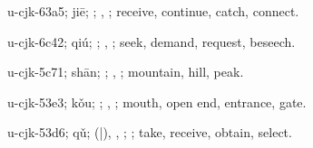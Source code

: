 \begin{multicols}{2}
{\cjkgGlue{}u-cjk-63a5; jiē; \cjkgGlue{}\cjkgGlue{}\cjkgGlue{}; \cjkgGlue{}, \cjkgGlue{}; receive, continue, catch, connect.

\cjkgGlue{}u-cjk-6c42; qiú; \cjkgGlue{}\cjkgGlue{}\cjkgGlue{}; \cjkgGlue{}, \cjkgGlue{}; seek, demand, request, beseech.

\cjkgGlue{}u-cjk-5c71; shān; \cjkgGlue{}; \cjkgGlue{}, \cjkgGlue{}; mountain, hill, peak.

\cjkgGlue{}u-cjk-53e3; kǒu; \cjkgGlue{}; \cjkgGlue{}, \cjkgGlue{}; mouth, open end, entrance, gate.

\cjkgGlue{}u-cjk-53d6; qǔ; \cjkgGlue{}\cjkgGlue{}(\cjkgGlue{}|\cjkgGlue{}), \cjkgGlue{}, \cjkgGlue{}\cjkgGlue{}\cjkgGlue{}; \cjkgGlue{}; take, receive, obtain, select.

}
\end{multicols}
